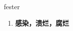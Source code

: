 
\begin{frame}
{\huge fester}
\begin{center}
\begin{enumerate}\Large
  \item \textbf{感染，溃烂，腐烂}
\end{enumerate}
\end{center}
\end{frame}
